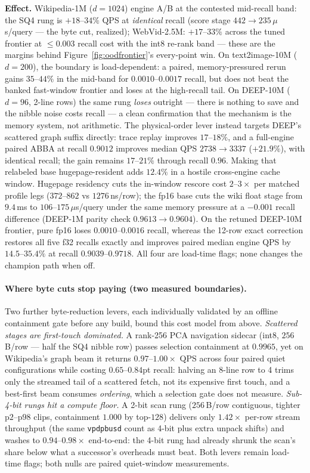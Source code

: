 \documentclass{article}
\newcommand{\effect}[1]{\par\smallskip\noindent\textbf{Effect.} #1}
\begin{document}
\effect{Wikipedia-1M ($d{=}1024$) engine A/B at the contested mid-recall band: the
SQ4 rung is $+18$--$34\%$ QPS at \emph{identical} recall (score stage
$442\to235\,\mu$s/query --- the byte cut, realized); WebVid-2.5M: $+17$--$33\%$
across the tuned frontier at ${\le}0.003$ recall cost with the int8 re-rank band ---
these are the margins behind Figure~\ref{fig:oodfrontier}'s every-point win. On
text2image-10M ($d{=}200$), the boundary is load-dependent: a paired, memory-pressured
rerun gains $35$--$44\%$ in the mid-band for $0.0010$--$0.0017$ recall, but does not
beat the banked fast-window frontier and loses at the high-recall tail. On DEEP-10M
($d{=}96$, 2-line rows) the same rung \emph{loses} outright --- there is nothing to
save and the nibble noise costs recall --- a clean confirmation that the mechanism
is the memory system, not arithmetic. The physical-order lever instead targets
DEEP's scattered graph suffix directly: trace replay improves $17$--$18\%$, and a
full-engine paired ABBA at recall $0.9012$ improves median QPS $2738\to3337$
($+21.9\%$), with identical recall; the gain remains $17$--$21\%$ through recall
$0.96$. Making that relabeled base hugepage-resident adds $12.4\%$ in a hostile
cross-engine cache window. Hugepage residency cuts the in-window rescore
cost $2$--$3\times$ per matched profile legs ($372$--$862$ vs $1276$\,ns/row); the
fp16 base cuts the wiki float stage from $9.4$\,ms to $106$--$175\,\mu$s/query under
the same memory pressure at a $-0.001$ recall difference (DEEP-1M parity check
$0.9613\to0.9604$). On the retuned DEEP-10M frontier, pure fp16 loses
$0.0010$--$0.0016$ recall, whereas the 12-row exact correction restores all five
f32 recalls exactly and improves paired median engine QPS by $14.5$--$35.4\%$
at recall $0.9039$--$0.9718$. All four are load-time flags; none changes the
champion path when off.}

\paragraph{Where byte cuts stop paying (two measured boundaries).}
Two further byte-reduction levers, each individually validated by an offline
containment gate before any build, bound this cost model from above.
\emph{Scattered stages are first-touch dominated.} A rank-256 PCA navigation
sidecar (int8, $256$\,B/row --- half the SQ4 nibble row) passes selection
containment at $0.9965$, yet on Wikipedia's graph beam it returns
$0.97$--$1.00\times$ QPS across four paired quiet configurations while costing
$0.65$--$0.84$pt recall: halving an 8-line row to 4 trims only the streamed tail
of a scattered fetch, not its expensive first touch, and a best-first beam
consumes \emph{ordering}, which a selection gate does not measure.
\emph{Sub-4-bit rungs hit a compute floor.} A 2-bit scan rung ($256$\,B/row
contiguous, tighter p$2$--p$98$ clips, containment $1.000$ by top-$128$)
delivers only $1.42\times$ per-row stream throughput (the same
\texttt{vpdpbusd} count as 4-bit plus extra unpack shifts) and washes to
$0.94$--$0.98\times$ end-to-end: the 4-bit rung had already shrunk the scan's
share below what a successor's overheads must beat. Both levers remain
load-time flags; both nulls are paired quiet-window measurements.
\end{document}
